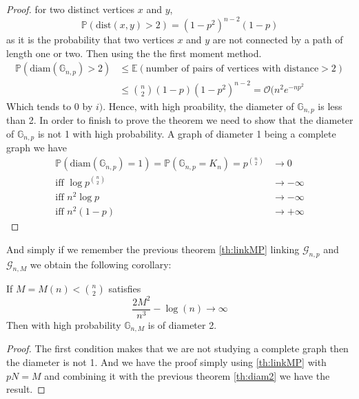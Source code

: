 \begin{proof}
	for two distinct vertices $x$ and $y$,
	\begin{equation}
		\mathbb{P}(\text{dist}(x, y) > 2) = (1-p^2)^{n-2}(1-p)
	\end{equation}
	as it is the probability that two vertices $x$ and $y$ are not connected by a path of length one or two.
	\newline
	Then using the the first moment method.
	\begin{align}
		\mathbb{P}(\text{diam}(\mathbb{G}_{n,p}) > 2) 	&\leq \mathbb{E}(\text{number of pairs of vertices with distance} > 2) \\
								&\leq \binom{n}{2}(1-p)(1-p^2)^{n-2} = \mathcal{O}(n^2e^{-np^2}
	\end{align}
	Which tends to 0 by $i)$. Hence, with high proability, the diameter of $\mathbb{G}_{n,p}$ is less than 2. 
	In order to finish to prove the theorem we need to show that the diameter of $\mathbb{G}_{n,p}$ is not 1 with high probability.
	A graph of diameter 1 being a complete graph we have
	\begin{align}
		\mathbb{P}(\text{diam}(\mathbb{G}_{n,p}) = 1) = \mathbb{P}(\mathbb{G}_{n,p} = K_n) 	
				= p^{\binom{n}{2}} &\longrightarrow 0				\\
		\text{iff  } \log p^{\binom{n}{2}} &\longrightarrow -\infty			\\
			   \text{iff  } n^2 \log p &\longrightarrow -\infty			\\
	\text{iff  } n^2 (1-p) &\longrightarrow +\infty			
	\end{align}	
\end{proof}
And simply if we remember the previous theorem \eqref{th:linkMP} linking $\mathcal{G}_{n,p}$ and $\mathcal{G}_{n,M}$ we obtain the following corollary:
\begin{corollary}
	If $M=M(n) < \binom{n}{2}$ satisfies 
	\begin{equation}
		\frac{2M^2}{n^3} - \log(n) \longrightarrow \infty
	\end{equation}
	Then with high probability $\mathbb{G}_{n, M}$ is of diameter 2.
\end{corollary}
\begin{proof}
	The first condition makes that we are not studying a complete graph then the diameter is not 1.
	And we have the proof simply using \eqref{th:linkMP} with $pN = M$ and combining it with the previous theorem \eqref{th:diam2} we have the result.
\end{proof}

